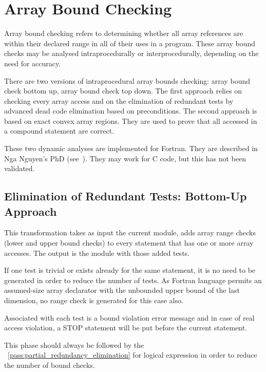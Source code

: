 \documentclass[a4paper]{report}
\newcommand{\PipsPassRef}[1]{\texttt{\detokenize{#1}}~\ref{pass:#1}}
\newenvironment{PipsPass}[1]{\label{pass:#1}}{}
\begin{document}

\section{Array Bound Checking}
\label{subsection-array-bound-checking}

Array bound checking refers to determining whether all array references
are within their declared range in all of their uses in a program. These
array  bound checks may be analysed intraprocedurally or
interprocedurally, depending on the need for accuracy.

There are two versions of intraprocedural array bounds checking: array
bound check bottom up, array bound check top down. The first approach
relies on checking every array access and on the elimination of
redundant tests by advanced dead code elimination based on
preconditions. The second approach is based on exact convex array
regions. They are used to prove that all accessed in a compound
statement are correct.

These two dynamic analyses are implemented for Fortran. They are
described in Nga Nguyen's PhD (see~\cite{Ngu02}). They
may work for C code, but this has not been validated.


\subsection{Elimination of Redundant Tests: Bottom-Up Approach}
\label{subsection-array-bound-check_bottom_up}

\begin{PipsPass}{array_bound_check_bottom_up}
This transformation takes as input the current module, adds array range
checks (lower and upper bound checks) to every statement that has one or
more array accesses. The output is the module with those added tests.

If one test is trivial or exists already for the same statement, it is
no need to be generated in order to reduce the
number of tests.  As Fortran language permits an assumed-size array
declarator with the unbounded upper bound of the last dimension, no range check is generated for this case also.

Associated with each test is a bound violation error message and in case
of real access violation, a STOP statement will be put before the current
statement.

This phase should always be followed by the
\PipsPassRef{partial_redundancy_elimination} for logical expression in
order to reduce the number of bound checks.
\end{PipsPass}
\end{document}
